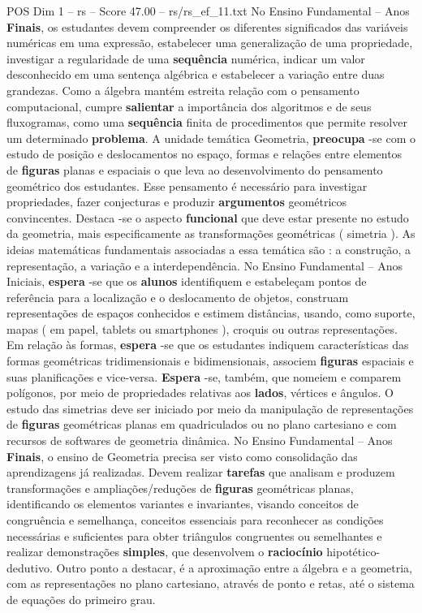 \begin{textsample}{POS Dim 1 – rs – Score 47.00 – rs/rs\_ef\_11.txt}
No Ensino Fundamental – Anos \textbf{Finais}, os estudantes devem compreender os diferentes significados das variáveis numéricas em uma expressão, estabelecer uma generalização de uma propriedade, investigar a regularidade de uma \textbf{sequência} numérica, indicar um valor desconhecido em uma sentença algébrica e estabelecer a variação entre duas grandezas.
Como a álgebra mantém estreita relação com o pensamento computacional, cumpre \textbf{salientar} a importância dos algoritmos e de seus fluxogramas, como uma \textbf{sequência} finita de procedimentos que permite resolver um determinado \textbf{problema}.
A unidade temática Geometria, \textbf{preocupa} -se com o estudo de posição e deslocamentos no espaço, formas e relações entre elementos de \textbf{figuras} planas e espaciais o que leva ao desenvolvimento do pensamento geométrico dos estudantes.
Esse pensamento é necessário para investigar propriedades, fazer conjecturas e produzir \textbf{argumentos} geométricos convincentes.
Destaca -se o aspecto \textbf{funcional} que deve estar presente no estudo da geometria, mais especificamente as transformações geométricas ( simetria ).
As ideias matemáticas fundamentais associadas a essa temática são : a construção, a representação, a variação e a interdependência.
No Ensino Fundamental – Anos Iniciais, \textbf{espera} -se que os \textbf{alunos} identifiquem e estabeleçam pontos de referência para a localização e o deslocamento de objetos, construam representações de espaços conhecidos e estimem distâncias, usando, como suporte, mapas ( em papel, tablets ou smartphones ), croquis ou outras representações.
Em relação às formas, \textbf{espera} -se que os estudantes indiquem características das formas geométricas tridimensionais e bidimensionais, associem \textbf{figuras} espaciais e suas planificações e vice-versa. \textbf{Espera} -se, também, que nomeiem e comparem polígonos, por meio de propriedades relativas aos \textbf{lados}, vértices e ângulos.
O estudo das simetrias deve ser iniciado por meio da manipulação de representações de \textbf{figuras} geométricas planas em quadriculados ou no plano cartesiano e com recursos de softwares de geometria dinâmica.
No Ensino Fundamental – Anos \textbf{Finais}, o ensino de Geometria precisa ser visto como consolidação das aprendizagens já realizadas.
Devem realizar \textbf{tarefas} que analisam e produzem transformações e ampliações/reduções de \textbf{figuras} geométricas planas, identificando os elementos variantes e invariantes, visando conceitos de congruência e semelhança, conceitos essenciais para reconhecer as condições necessárias e suficientes para obter triângulos congruentes ou semelhantes e realizar demonstrações \textbf{simples}, que desenvolvem o \textbf{raciocínio} hipotético-dedutivo.
Outro ponto a destacar, é a aproximação entre a álgebra e a geometria, com as representações no plano cartesiano, através de ponto e retas, até o sistema de equações do primeiro grau.


\end{textsample}
